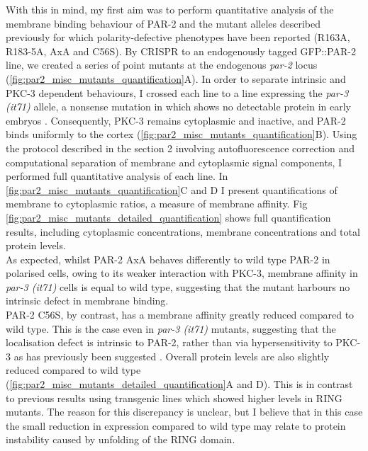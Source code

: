 \documentclass[12pt]{"report"}
\begin{document}
With this in mind, my first aim was to perform quantitative analysis of the membrane binding behaviour of PAR-2 and the mutant alleles described previously for which polarity-defective phenotypes have been reported (R163A, R183-5A, AxA and C56S). By CRISPR to an endogenously tagged GFP::PAR-2 line, we created a series of point mutants at the endogenous \textit{par-2} locus (\cref{fig:par2_misc_mutants_quantification}A). In order to separate intrinsic and PKC-3 dependent behaviours, I crossed each line to a line expressing the \textit{par-3 (it71)} allele, a nonsense mutation in which shows no detectable protein in early embryos \citep{Etemad-Moghadam1995}. Consequently, PKC-3 remains cytoplasmic and inactive, and PAR-2 binds uniformly to the cortex (\cref{fig:par2_misc_mutants_quantification}B). Using the protocol described in the section 2 involving autofluorescence correction and computational separation of membrane and cytoplasmic signal components, I performed full quantitative analysis of each line. In \cref{fig:par2_misc_mutants_quantification}C and D I present quantifications of membrane to cytoplasmic ratios, a measure of membrane affinity. Fig \ref{fig:par2_misc_mutants_detailed_quantification} shows full quantification results, including cytoplasmic concentrations, membrane concentrations and total protein levels.\\

As expected, whilst PAR-2 AxA behaves differently to wild type PAR-2 in polarised cells, owing to its weaker interaction with PKC-3, membrane affinity in \textit{par-3 (it71)} cells is equal to wild type, suggesting that the mutant harbours no intrinsic defect in membrane binding.\\

PAR-2 C56S, by contrast, has a membrane affinity greatly reduced compared to wild type. This is the case even in \textit{par-3 (it71)} mutants, suggesting that the localisation defect is intrinsic to PAR-2, rather than via hypersensitivity to PKC-3 as has previously been suggested \citep{Hao2006}. Overall protein levels are also slightly reduced compared to wild type (\cref{fig:par2_misc_mutants_detailed_quantification}A and D). This is in contrast to previous results using transgenic lines which showed higher levels in RING mutants. The reason for this discrepancy is unclear, but I believe that in this case the small reduction in expression compared to wild type may relate to protein instability caused by unfolding of the RING domain.\\
\end{document}
